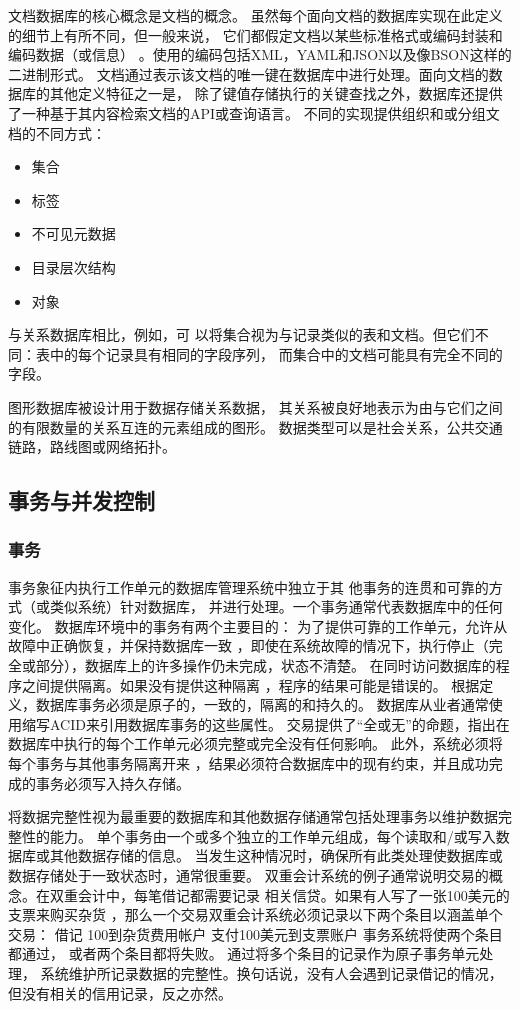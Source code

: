 文档数据库的核心概念是文档的概念。
虽然每个面向文档的数据库实现在此定义的细节上有所不同，但一般来说，
它们都假定文档以某些标准格式或编码封装和编码数据（或信息）
。使用的编码包括XML，YAML和JSON以及像BSON这样的二进制形式。
文档通过表示该文档的唯一键在数据库中进行处理。面向文档的数据库的其他定义特征之一是，
除了键值存储执行的关键查找之外，数据库还提供了一种基于其内容检索文档的API或查询语言。
不同的实现提供组织和或分组文档的不同方式：
\begin{itemize}
	\item 集合
	\item 标签
	\item 不可见元数据
	\item 目录层次结构
	\item 对象
\end{itemize}
与关系数据库相比，例如，可
以将集合视为与记录类似的表和文档。但它们不同：表中的每个记录具有相同的字段序列，
而集合中的文档可能具有完全不同的字段。

图形数据库被设计用于数据存储关系数据，
其关系被良好地表示为由与它们之间的有限数量的关系互连的元素组成的图形。
数据类型可以是社会关系，公共交通链路，路线图或网络拓扑。
\subsection{事务与并发控制}
\subsubsection{事务}
事务象征内执行工作单元的数据库管理系统中独立于其
他事务的连贯和可靠的方式（或类似系统）针对数据库，
并进行处理。一个事务通常代表数据库中的任何变化。
数据库环境中的事务有两个主要目的：
为了提供可靠的工作单元，允许从故障中正确恢复，并保持数据库一致
，即使在系统故障的情况下，执行停止（完全或部分），数据库上的许多操作仍未完成，状态不清楚。
在同时访问数据库的程序之间提供隔离。如果没有提供这种隔离
，程序的结果可能是错误的。
根据定义，数据库事务必须是原子的，一致的，隔离的和持久的。
数据库从业者通常使用缩写ACID来引用数据库事务的这些属性。
交易提供了“全或无”的命题，指出在数据库中执行的每个工作单元必须完整或完全没有任何影响。
此外，系统必须将每个事务与其他事务隔离开来
，结果必须符合数据库中的现有约束，并且成功完成的事务必须写入持久存储。

将数据完整性视为最重要的数据库和其他数据存储通常包括处理事务以维护数据完整性的能力。
单个事务由一个或多个独立的工作单元组成，每个读取和/或写入数据库或其他数据存储的信息。
当发生这种情况时，确保所有此类处理使数据库或数据存储处于一致状态时，通常很重要。
双重会计系统的例子通常说明交易的概念。在双重会计中，每笔借记都需要记录
相关信贷。如果有人写了一张100美元的支票来购买杂货
，那么一个交易双重会计系统必须记录以下两个条目以涵盖单个交易：
借记 100到杂货费用帐户
支付100美元到支票账户
事务系统将使两个条目都通过，
或者两个条目都将失败。
通过将多个条目的记录作为原子事务单元处理，
系统维护所记录数据的完整性。换句话说，没有人会遇到记录借记的情况，但没有相关的信用记录，反之亦然。

